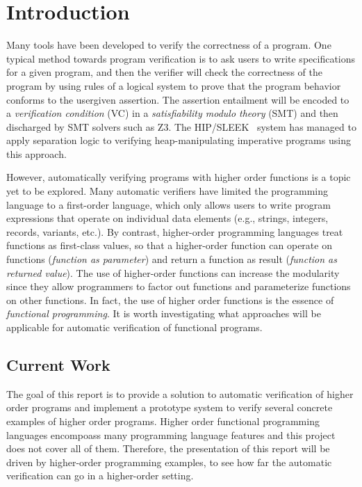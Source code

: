 
\chapter{Introduction}
\vspace{2em}



Many tools have been developed to verify the correctness of a program. One typical method towards program verification is to ask users to write specifications for a given program, and then the verifier will check the correctness of the program by using rules of a logical system to prove that the program behavior conforms to the user\zz{}given assertion. The assertion entailment will be encoded to a \emph{verification condition} (VC) in a \emph{satisfiability modulo theory} (SMT) and then discharged by SMT solvers such as Z3. The HIP/SLEEK~\cite{Chin2012HipSleek} system has managed to apply separation logic to verifying heap-manipulating imperative programs using this approach.

However, automatically verifying programs with higher order functions is a topic yet to be explored. Many automatic verifiers
have limited the programming language to a first-order language, which only allows users to write program expressions that operate on individual data elements (e.g., strings, integers, records, variants, etc.). By contrast, higher-order programming languages treat functions as first-class values, so that a higher-order function can operate on functions (\emph{function as parameter}) and return a function as result (\emph{function as returned value}). The use of higher-order functions can increase the modularity since they allow programmers to factor out functions and parameterize functions on other functions. In fact, the use of higher order functions is the essence of \emph{functional programming}. It is worth investigating what approaches will be applicable for automatic verification of functional programs.


\section{Current Work}

The goal of this report is to provide a solution to automatic verification of higher order programs and implement a prototype system to verify several concrete examples of higher order programs. Higher order functional programming languages encompoass many programming language features and this project does not cover all of them. Therefore, the presentation of this report will be driven by higher-order programming examples, to see how far the automatic verification can go in a higher-order setting.

